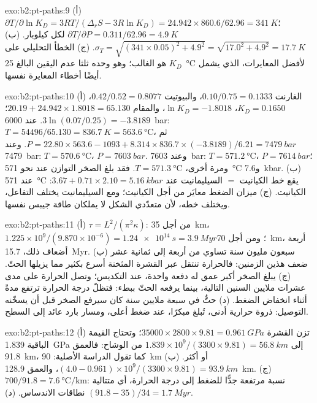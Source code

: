 \begin{solution}{exo:b2:pt-paths:9}
(أ) $\partial T/\partial\ln K_D = 3RT/(\Delta_r S - 3R\ln K_D) = 24.942\times860.6/62.96 =
\qty{341}{K}$؛ $\partial T/\partial P = 0.311/62.96 = \qty{4.9}{K}$ لكل كيلوبار.
(ب) $\sigma_T = \sqrt{(341\times0.05)^2 + 4.9^2} = \sqrt{17.0^2 + 4.9^2} =
\qty{17.7}{K}$. (ج) الخطأ التحليلي على $K_D$ هو الغالب؛ وهو وحده ثلثا
عدم اليقين البالغ \qty{25}{\celsius} لأفضل المعايرات، الذي يشمل أيضًا أخطاء
المعايرة نفسها.
\end{solution}

\begin{solution}{exo:b2:pt-paths:10}
(أ) الغارنت $0.10/0.75 = 0.1333$، والبيوتيت $0.42/0.52 = 0.8077$، $K_D = 0.1650$، $\ln K_D =
-1.8018$، والمقام $20.19 + 24.942\times1.8018 = 65.130$؛ $3\ln(0.07/0.25) = -3.8189$.
عند \qty{6000}{bar}: $T = 54496/65.130 = \qty{836.7}{K} = \qty{563.6}{\celsius}$، ثم $P
= 22.80\times563.6 - 1093 + 8.314\times836.7\times(-3.8189)/6.21 = \qty{7479}{bar}$.
وعند \qty{7479}{bar}: $T = \qty{570.6}{\celsius}$، $P = \qty{7603}{bar}$. وعند
\qty{7603}{bar}: $T = \qty{571.2}{\celsius}$، $P = \qty{7614}{bar}$؛ ومرة أخرى، $T =
\qty{571.3}{\celsius}$. فقد بلغ الصخر التوازن عند نحو \qty{571}{\celsius}
و\qty{7.6}{kbar}. (ب) عند \qty{571}{\celsius} يقع خط الكيانيت $=$ السيليمانيت عند $3.67
+ 0.71\times2.10 = \qty{5.16}{kbar}$: الكيانيت. (ج) ميزان الضغط معايَر من أجل
الكيانيت؛ ومع السيليمانيت يختلف التفاعل، ويختلف خطه، لأن متعدّدي الشكل لا
يملكان طاقة جيبس نفسها.
\end{solution}

\begin{solution}{exo:b2:pt-paths:11}
(أ) $\tau = L^2/(\pi^2\kappa)$: من أجل \qty{35}{km}، $1.225\times10^9/(9.870\times10^{-6}) =
\qty{1.24e14}{s} = \qty{3.9}{Myr}$؛ ومن أجل \qty{70}{km}، أربعة أضعاف ذلك،
\qty{15.7}{Myr}. (ب) سبعون مليون سنة تساوي من أربعة إلى ثمانية عشر ضعف هذين الزمنين: فالحرارة
تنتقل عبر القشرة المثخنة أسرع بكثير مما يزيلها الحتّ. (ج) يبلغ الصخر
أكبر عمق له دفعة واحدة، عند التكديس؛ وتصل الحرارة على مدى عشرات ملايين السنين
التالية، بينما يرفعه الحتّ ببطء: فتظلّ درجة الحرارة
ترتفع مدةً أثناء انخفاض الضغط. (د) حتٌّ في سبعة ملايين سنة كان
سيرفع الصخر قبل أن يسخّنه التوصيل: ذروة حرارية أدنى، تُبلغ
مبكرًا، عند ضغط أعلى، ومسار بارد عائد إلى السطح.
\end{solution}

\begin{solution}{exo:b2:pt-paths:12}
(أ) تزن القشرة $35000\times2800\times9.81 = \qty{0.961}{GPa}$؛ وتحتاج القيمة الباقية
\qty{1.839}{GPa} إلى $1.839\times10^9/(3300\times9.81) = \qty{56.8}{km}$ من الوشاح: فالعمق
\qty{91.8}{km}، كما تقول الدراسة الأصلية: \qty{90}{km} أو أكثر. (ب) $(4.0 -
0.961)\times10^9/(3300\times9.81) = \qty{93.9}{km}$، والعمق \qty{128.9}{km}.
(ج) $700/91.8 = \qty{7.6}{\celsius\per\km}$: نسبة مرتفعة جدًّا للضغط إلى
درجة الحرارة، أي متتالية نطاقات الاندساس. (د) $(91.8 - 35)/34 = \qty{1.7}{Myr}$.
\end{solution}

